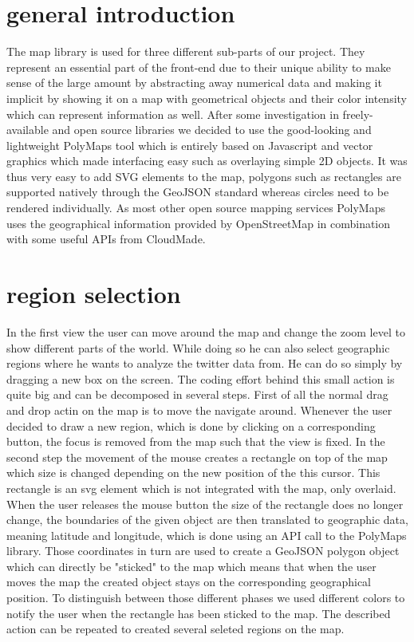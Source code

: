 \section{general introduction}

The map library is used for three different sub-parts of our project. They represent an essential part of the front-end due to their unique ability to make sense of the large amount by abstracting away numerical data and making it implicit by showing it on a map with geometrical objects and their color intensity which can represent information as well.
After some investigation in freely-available and open source libraries we decided to use the good-looking and lightweight PolyMaps tool which is entirely based on Javascript and vector graphics which made interfacing easy such as overlaying simple 2D objects. It was thus very easy to add SVG elements to the map, polygons such as rectangles are supported natively through the GeoJSON standard whereas circles need to be rendered individually. As most other open source mapping services PolyMaps uses the geographical information provided by OpenStreetMap in combination with some useful APIs from CloudMade. 

\section{region selection}
In the first view the user can move around the map and change the zoom level to show different parts of the world. While doing so he can also select geographic regions where he wants to analyze the twitter data from. He can do so simply by dragging a new box on the screen. The coding effort behind this small action is quite big and can be decomposed in several steps. First of all the normal drag and drop actin on the map is to move the navigate around. Whenever the user decided to draw a new region, which is done by clicking on a corresponding button, the focus is removed from the map such that the view is fixed. In the second step the movement of the mouse creates a rectangle on top of the map which size is changed depending on the new position of the this cursor. This rectangle is an svg element which is not integrated with the map, only overlaid. When the user releases the mouse button the size of the rectangle does no longer change, the boundaries of the given object are then translated to geographic data, meaning latitude and longitude, which is done using an API call to the PolyMaps library. Those coordinates in turn are used to create a GeoJSON polygon object which can directly be "sticked" to the map which means that when the user moves the map the created object stays on the corresponding geographical position. To distinguish between those different phases we used different colors to notify the user when the rectangle has been sticked to the map. The described action can be repeated to created several seleted regions on the map.

